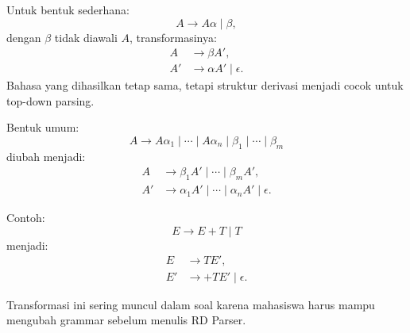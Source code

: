 Untuk bentuk sederhana:
\[
    A\rightarrow A\alpha \mid \beta,
\]
dengan $\beta$ tidak diawali $A$, transformasinya:
\[
\begin{aligned}
    A &\rightarrow \beta A',\\
    A' &\rightarrow \alpha A' \mid \epsilon.
\end{aligned}
\]
Bahasa yang dihasilkan tetap sama, tetapi struktur derivasi menjadi cocok untuk top-down parsing.

Bentuk umum:
\[
    A\rightarrow A\alpha_1\mid\cdots\mid A\alpha_n\mid\beta_1\mid\cdots\mid\beta_m
\]
diubah menjadi:
\[
\begin{aligned}
    A &\rightarrow \beta_1A'\mid\cdots\mid\beta_mA',\\
    A' &\rightarrow \alpha_1A'\mid\cdots\mid\alpha_nA'\mid\epsilon.
\end{aligned}
\]

Contoh:
\[
    E\rightarrow E+T\mid T
\]
menjadi:
\[
\begin{aligned}
    E &\rightarrow TE',\\
    E' &\rightarrow +TE'\mid\epsilon.
\end{aligned}
\]

Transformasi ini sering muncul dalam soal karena mahasiswa harus mampu mengubah grammar sebelum menulis RD Parser.

